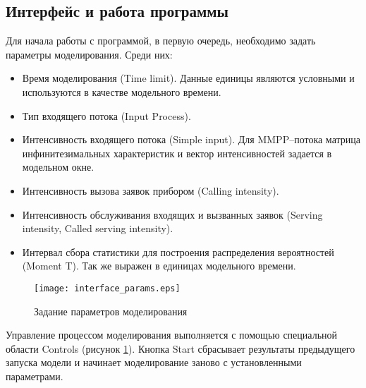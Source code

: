 \subsection{Интерфейс и работа программы}
Для начала работы с программой, в первую очередь, необходимо задать параметры моделирования. Среди них:
\begin{itemize}
	\item Время моделирования (Time limit). Данные единицы являются условными и используются в качестве модельного времени.
	\item Тип входящего потока (Input Process).
	\item Интенсивность входящего потока (Simple input). Для MMPP--потока матрица инфинитезимальных характеристик и вектор интенсивностей задается в модельном окне.
	\item Интенсивность вызова заявок прибором (Calling intensity).
	\item Интенсивность обслуживания входящих и вызванных заявок (Serving intensity, Called serving intensity).
	\item Интервал сбора статистики для построения распределения вероятностей (Moment T). Так же выражен в единицах модельного времени.
\end{itemize}
   \begin{figure}[H]
	\centering
	\texttt{[image: interface\_params.eps]}
	\caption{Задание параметров моделирования}
	\label{interface_params}
\end{figure}
Управление процессом моделирования выполняется с помощью специальной области Controls (рисунок \ref{interface_params}). Кнопка Start сбрасывает результаты предыдущего запуска модели и начинает моделирование заново с установленными параметрами.
